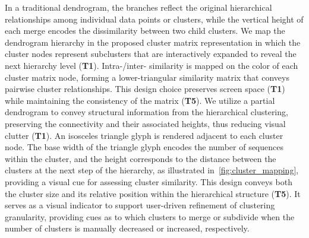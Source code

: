 \documentclass[preprint,journal]{vgtc}            %
\begin{document}
In a traditional dendrogram, the branches reflect the original hierarchical relationships among individual data points or clusters, while the vertical height of each merge encodes the dissimilarity between two child clusters.
We map the dendrogram hierarchy in the proposed cluster matrix representation in which the cluster nodes represent subclusters that are interactively expanded to reveal the next hierarchy level (\textbf{T1}). 
Intra-/inter- similarity is mapped on the color of each cluster matrix node, forming a lower-triangular similarity matrix that conveys pairwise cluster relationships. 
This design choice preserves screen space (\textbf{T1}) while maintaining the consistency of the matrix (\textbf{T5}).
We utilize a partial dendrogram to convey structural information from the hierarchical clustering, preserving the connectivity and their associated heights, thus reducing visual clutter (\textbf{T1}).
An isosceles triangle glyph is rendered adjacent to each cluster node. The base width of the triangle glyph encodes the number of sequences within the cluster, and the height corresponds to the distance between the clusters at the next step of the hierarchy, as illustrated in~\cref{fig:cluster_mapping}, providing a visual cue for assessing cluster similarity.
This design conveys both the cluster size and its relative position within the hierarchical structure (\textbf{T5}). It serves as a visual indicator to support user-driven refinement of clustering granularity, providing cues as to which clusters to merge or subdivide when the number of clusters is manually decreased or increased, respectively.
\end{document}
